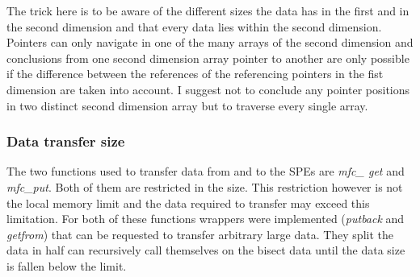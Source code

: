 The trick here is to be aware of the different sizes the data has in the first and in the second dimension and that every data lies within the second dimension. Pointers can only navigate in one of the many arrays of the second dimension and conclusions from one second dimension array pointer to another are only possible if the difference between the references of the referencing pointers in the fist dimension are taken into account. I suggest not to conclude any pointer positions in two distinct second dimension array but to traverse every single array. 

\subsubsection{Data transfer size}
The two functions used to transfer data from and to the SPEs are \emph{mfc\_ get} and \emph{mfc\_put}. Both of them are restricted in the size. This restriction however is not the local memory limit and the data required to transfer may exceed this limitation. For both of these functions wrappers were implemented (\emph{putback} and \emph{getfrom}) that can be requested to transfer arbitrary large data. They split the data in half can recursively call themselves on the bisect data until the data size is fallen below the limit.




